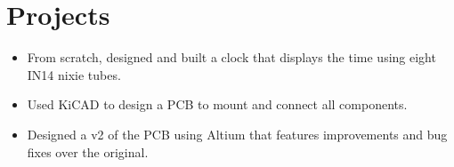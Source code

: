 \documentclass[]{deedy-resume-openfont}
\begin{document}
\begin{minipage}[t]{0.66\textwidth}




\section{Projects}

\begin{itemize}
    \setlength\itemsep{0pt}
    \item From scratch, designed and built a clock that displays the time using eight IN14 nixie tubes.
    \item Used KiCAD to design a PCB to mount and connect all components.
    \item Designed a v2 of the PCB using Altium that features improvements and bug fixes over the original.
\end{itemize}

\sectionsep



\end{minipage}
\end{document}
